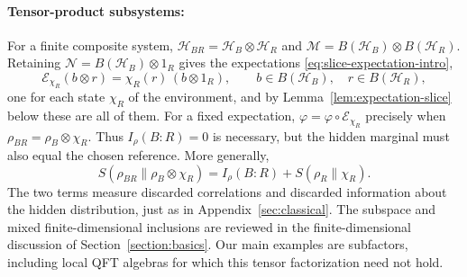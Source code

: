 \documentclass[a4paper,11pt]{article}
\theoremstyle{definition}
\newcommand{\mR}{\mathcal{R}}
\newcommand{\mN}{\mathcal{N}}
\newcommand{\mH}{\mathcal{H}}
\newcommand{\mM}{\mathcal{M}}
\newcommand{\mE}{\mathcal{E}}
\begin{document}
\paragraph{Tensor-product subsystems:}
For a finite composite system, $\mathcal H_{BR}=\mH_B\otimes\mH_R$ and
$\mM=B(\mathcal H_B)\otimes B(\mathcal H_R)$. Retaining $\mN=B(\mathcal H_B)\otimes1_R$ gives the expectations \eqref{eq:slice-expectation-intro},
\begin{equation}\label{condexp}
 \mE_{\chi_R}(b\otimes r)=\chi_R(r)\,(b\otimes1_R),
 \qquad b\in B(\mathcal H_B),\quad r\in B(\mathcal H_R),
\end{equation}
one for each state $\chi_R$ of the environment, and by Lemma~\ref{lem:expectation-slice} below these are all of them.
For a fixed expectation, $\varphi=\varphi\circ\mE_{\chi_R}$ precisely when
$\rho_{BR}=\rho_B\otimes\chi_R$. Thus $I_\rho(B:R)=0$ is necessary, but the hidden
marginal must also equal the chosen reference. More generally,
\begin{equation}\label{eq:quantum-coarse-entropy-decomposition}
 S(\rho_{BR}\|\rho_B\otimes\chi_R)
 =I_\rho(B:R)+S(\rho_R\|\chi_R).
\end{equation}
The two terms measure discarded correlations and discarded information about the
hidden distribution, just as in Appendix~\ref{sec:classical}.
The subspace and mixed finite-dimensional inclusions are reviewed in
the finite-dimensional discussion of Section~\ref{section:basics}. Our main examples are subfactors, including
local QFT algebras for which this tensor factorization need not hold.
\end{document}
